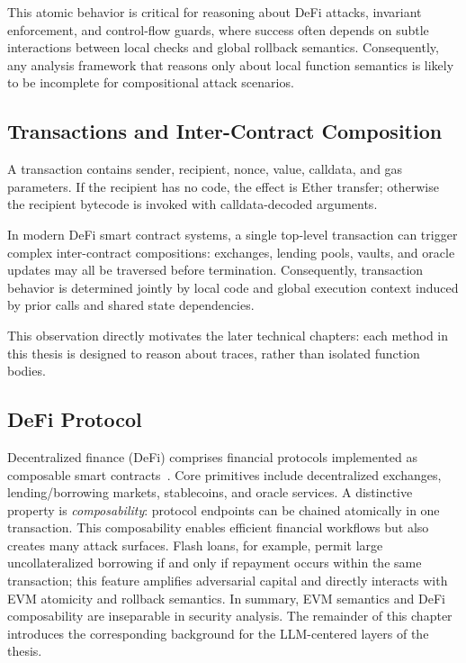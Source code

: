 This atomic behavior is critical for 
reasoning about DeFi attacks, invariant 
enforcement, and control-flow guards, where success 
often depends on subtle interactions between local 
checks and global rollback semantics.
Consequently, any analysis framework that 
reasons only about local function semantics 
is likely to be incomplete for compositional
attack scenarios.

\subsection{Transactions and Inter-Contract Composition}
A transaction contains sender, recipient, nonce, 
value, calldata, and gas parameters. If the 
recipient has no code, the effect is Ether 
transfer; otherwise the recipient bytecode 
is invoked with calldata-decoded arguments.

In modern DeFi smart contract systems, a single top-level 
transaction can trigger complex inter-contract 
compositions: exchanges, lending pools, 
vaults, and oracle updates may all be traversed 
before termination. Consequently, transaction 
behavior is determined jointly by local code and global 
execution context induced by prior calls and shared 
state dependencies.

This observation directly motivates the later 
technical chapters: each method in this thesis is 
designed to reason about traces, rather than 
isolated function bodies.

\subsection{DeFi Protocol}
Decentralized finance (DeFi) comprises 
financial protocols implemented as composable 
smart contracts~\cite{wust2018you}. Core primitives 
include decentralized exchanges, 
lending/borrowing markets, stablecoins, and oracle services. 
A distinctive property is \emph{composability}: 
protocol endpoints can be chained atomically 
in one transaction.
This composability enables efficient financial 
workflows but also creates many attack 
surfaces. Flash loans, for example, permit 
large uncollateralized borrowing if and only 
if repayment occurs within the same transaction; 
this feature amplifies adversarial capital 
and directly interacts with EVM atomicity and 
rollback semantics.
In summary, EVM semantics and DeFi composability 
are inseparable in security analysis. 
The remainder of this chapter introduces the corresponding
background for the LLM-centered layers of the thesis.

